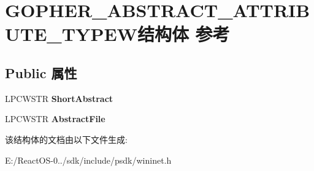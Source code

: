 \hypertarget{struct_g_o_p_h_e_r___a_b_s_t_r_a_c_t___a_t_t_r_i_b_u_t_e___t_y_p_e_w}{}\section{G\+O\+P\+H\+E\+R\+\_\+\+A\+B\+S\+T\+R\+A\+C\+T\+\_\+\+A\+T\+T\+R\+I\+B\+U\+T\+E\+\_\+\+T\+Y\+P\+E\+W结构体 参考}
\label{struct_g_o_p_h_e_r___a_b_s_t_r_a_c_t___a_t_t_r_i_b_u_t_e___t_y_p_e_w}
\subsection*{Public 属性}
\begin{DoxyCompactItemize}
\item 
\mbox{\label{struct_g_o_p_h_e_r___a_b_s_t_r_a_c_t___a_t_t_r_i_b_u_t_e___t_y_p_e_w_a15d1067affb49ff8778489a1e59e906f}} 
L\+P\+C\+W\+S\+TR {\bfseries Short\+Abstract}
\item 
\mbox{\label{struct_g_o_p_h_e_r___a_b_s_t_r_a_c_t___a_t_t_r_i_b_u_t_e___t_y_p_e_w_aad1497f2a30e3368d2b1b004f243e785}} 
L\+P\+C\+W\+S\+TR {\bfseries Abstract\+File}
\end{DoxyCompactItemize}


该结构体的文档由以下文件生成\+:\begin{DoxyCompactItemize}
\item 
E\+:/\+React\+O\+S-\/0../sdk/include/psdk/wininet.\+h\end{DoxyCompactItemize}
